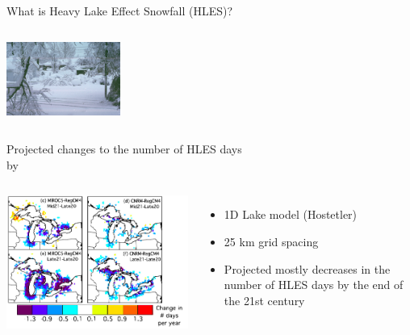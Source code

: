 \documentclass{beamer}
\begin{document}
\begin{frame}{What is Heavy Lake Effect Snowfall (HLES)?}
\begin{columns}
        \centering
        \includegraphics[height=6.5em,frame=0.05em]{hles_photo3}
    \end{columns}

  \end{frame}

  \begin{frame}{Projected changes to the number of HLES days\\ by~\citet{Notaro:2015}}
    \begin{columns}
        \includegraphics[height=0.6\textheight]{notaro_et_al_changes_to_hles_days.png}
        \begin{itemize}
          \item 1D Lake model (Hostetler)
          \item 25 km grid spacing
          \item Projected mostly decreases in the number of HLES days by the end of the 21st century
        \end{itemize}

    \end{columns}
  \end{frame}
\end{document}
